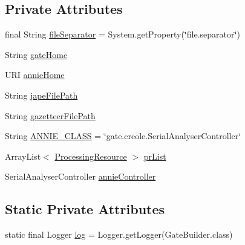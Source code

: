 \subsection*{Private Attributes}
\begin{DoxyCompactItemize}
\item 
final String \hyperlink{classcom_1_1poly_1_1nlp_1_1filekommander_1_1gate_1_1_gate_builder_aca691fb8ad715fd61ccf5845647c7bf2}{file\-Separator} = System.\-get\-Property(\char`\"{}file.\-separator\char`\"{})
\item 
String \hyperlink{classcom_1_1poly_1_1nlp_1_1filekommander_1_1gate_1_1_gate_builder_abdefcfc6edae8b7edf26f0381ed9da34}{gate\-Home}
\item 
U\-R\-I \hyperlink{classcom_1_1poly_1_1nlp_1_1filekommander_1_1gate_1_1_gate_builder_a4f34ff5f89a6a8a2ddcc72935cb6f51d}{annie\-Home}
\item 
String \hyperlink{classcom_1_1poly_1_1nlp_1_1filekommander_1_1gate_1_1_gate_builder_a58783e8638545aa5ea65a89aa1061dde}{jape\-File\-Path}
\item 
String \hyperlink{classcom_1_1poly_1_1nlp_1_1filekommander_1_1gate_1_1_gate_builder_adceaef80d20a83bd8c1cded83b90a692}{gazetteer\-File\-Path}
\item 
String \hyperlink{classcom_1_1poly_1_1nlp_1_1filekommander_1_1gate_1_1_gate_builder_a39a6c089a884f6318ae963e21b8fc3bf}{A\-N\-N\-I\-E\-\_\-\-C\-L\-A\-S\-S} = \char`\"{}gate.\-creole.\-Serial\-Analyser\-Controller\char`\"{}
\item 
Array\-List$<$ \hyperlink{classcom_1_1poly_1_1nlp_1_1filekommander_1_1gate_1_1_processing_resource}{Processing\-Resource} $>$ \hyperlink{classcom_1_1poly_1_1nlp_1_1filekommander_1_1gate_1_1_gate_builder_a4e56ddc3afefb48e751266e1e6449b7f}{pr\-List}
\item 
Serial\-Analyser\-Controller \hyperlink{classcom_1_1poly_1_1nlp_1_1filekommander_1_1gate_1_1_gate_builder_a3801bc53fd7b7449a0aa714ad21bebea}{annie\-Controller}
\end{DoxyCompactItemize}
\subsection*{Static Private Attributes}
\begin{DoxyCompactItemize}
\item 
static final Logger \hyperlink{classcom_1_1poly_1_1nlp_1_1filekommander_1_1gate_1_1_gate_builder_abbd1c14bf5a3ef4f39d4563dd498c467}{log} = Logger.\-get\-Logger(Gate\-Builder.\-class)
\end{DoxyCompactItemize}


